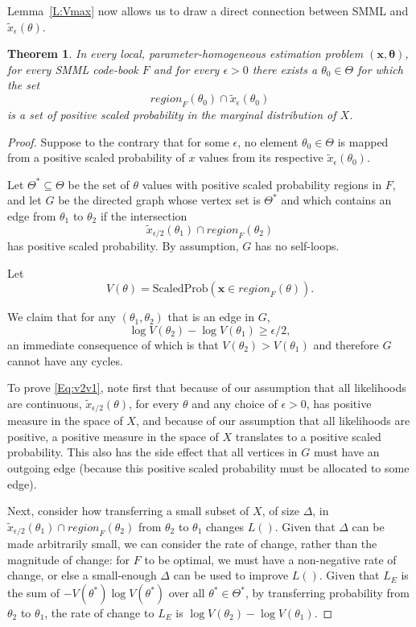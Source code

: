 \documentclass{IEEEtran}
\newtheorem{thm}{Theorem}
\begin{document}
Lemma~\ref{L:Vmax} now allows us to draw a direct connection between SMML and
$\tilde{x}_{\epsilon}(\theta)$.

\begin{thm}\label{T:approx}
In every local, parameter-homogeneous estimation problem
$(\mathbf{x},\boldsymbol{\theta})$, for every SMML code-book $F$
and for every $\epsilon>0$
there exists a $\theta_0\in\Theta$ for which the set
\[
\textit{region}_{F}(\theta_0)\cap \tilde{x}_{\epsilon}(\theta_0)
\]
is a set of positive scaled probability in the marginal distribution of $X$.
\end{thm}

\begin{proof}
Suppose to the contrary that for some $\epsilon$, no element
$\theta_0\in\Theta$ is mapped from a positive scaled probability of $x$
values from its respective $\tilde{x}_{\epsilon}(\theta_0)$.

Let $\Theta^*\subseteq\Theta$ be the set of $\theta$
values with positive scaled probability regions in $F$, and
let $G$ be the directed graph whose vertex set is $\Theta^*$ and which contains
an edge from $\theta_1$ to $\theta_2$ if the intersection
\[
\tilde{x}_{\epsilon/2}(\theta_1) \cap \textit{region}_F(\theta_2)
\]
has positive scaled probability.
By assumption, $G$ has no self-loops.

Let
\[
V(\theta)=\text{ScaledProb}(\mathbf{x}\in \textit{region}_F(\theta)).
\]

We claim that for any $(\theta_1,\theta_2)$ that is an edge in $G$,
\begin{equation}\label{Eq:v2v1}
\log V(\theta_2)-\log V(\theta_1)\ge\epsilon/2,
\end{equation}
an immediate consequence of which is that
$V(\theta_2)>V(\theta_1)$ and therefore $G$ cannot have any cycles.

To prove \eqref{Eq:v2v1}, note first that because of our assumption that
all likelihoods are continuous, $\tilde{x}_{\epsilon/2}(\theta)$, for every $\theta$
and any choice of $\epsilon>0$,
has positive measure in the space of $X$, and because of our assumption that
all likelihoods are positive, a positive measure in the space of $X$ translates
to a positive scaled probability. This also has the side effect that all
vertices in $G$ must have an outgoing edge (because this positive scaled
probability must be allocated to some edge).

Next, consider how transferring a small subset of $X$, of size
$\Delta$, in $\tilde{x}_{\epsilon/2}(\theta_1) \cap \textit{region}_F(\theta_2)$
from $\theta_2$
to $\theta_1$ changes $L()$. Given that $\Delta$ can be made arbitrarily small,
we can consider the rate of change, rather than the magnitude of change: for
$F$ to be optimal, we must have a non-negative rate of change, or else
a small-enough $\Delta$ can be used to improve $L()$.
Given that $L_E$ is the sum of
$-V(\theta^*) \log V(\theta^*)$ over all $\theta^*\in\Theta^*$,
by transferring probability from $\theta_2$ to $\theta_1$, the rate of change
to $L_E$ is $\log V(\theta_2)-\log V(\theta_1)$.


\end{proof}
\end{document}
